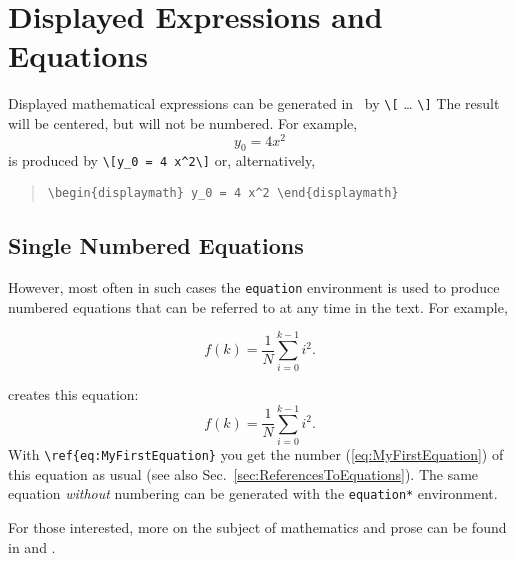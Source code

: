 \section{Displayed Expressions and Equations}

Displayed mathematical expressions can be generated in \latex\ by \verb!\[! \ldots 
\verb!\]! The result will be centered, but will not be numbered.
For example, \[y_0 = 4 x^2\] is produced by \verb!\[y_0 = 4 x^2\]!
or, alternatively,
\begin{quote}
 \verb!\begin{displaymath} y_0 = 4 x^2 \end{displaymath}!
\end{quote}


\subsection{Single Numbered Equations}

However, most often in such cases the \texttt{equation} environment is used
to produce numbered equations that can be referred to at any time in the text.
For example, 
%
\begin{LaTeXCode}[numbers=none]
\begin{equation}
	f(k) = \frac{1}{N} \sum_{i=0}^{k-1} i^2 .
	\label{eq:MyFirstEquation}
\end{equation}
\end{LaTeXCode}
%
creates this equation:
%
\begin{equation}
	f(k) = \frac{1}{N} \sum_{i=0}^{k-1} i^2 .
	\label{eq:MyFirstEquation}
\end{equation}
%
With \verb|\ref{eq:MyFirstEquation}| you get the number (\ref{eq:MyFirstEquation})
of this equation as usual (see also Sec.\ \ref{sec:ReferencesToEquations}).
The same equation \emph{without} numbering can be generated with the \texttt{equation*}
environment.
%
\begin{center}
	\setlength{\fboxrule}{0.2mm}
	\setlength{\fboxsep}{2mm}
\end{center}
%
For those interested, more on the subject of mathematics and prose can be found in
\cite{Mermin1989} and \cite{Higham2020}.


